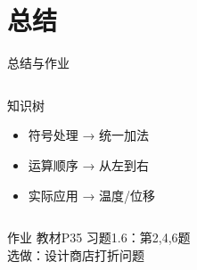 \documentclass{ctexbeamer}
\begin{document}
\section{总结}
\begin{frame}{总结与作业}
    \begin{columns}
        \begin{block}{知识树}
            \begin{itemize}
                \item 符号处理 → 统一加法
                \item 运算顺序 → 从左到右
                \item 实际应用 → 温度/位移
            \end{itemize}
        \end{block}

    \end{columns}

    \begin{alertblock}{作业}
        教材P35 习题1.6：第2,4,6题\\
        选做：设计商店打折问题
    \end{alertblock}
\end{frame}
\end{document}
